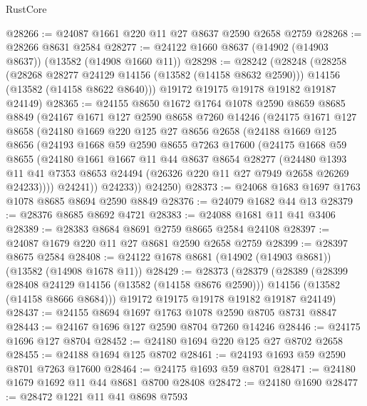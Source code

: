 \begin{lexlean}{RustCore}
\begin{coremodule}
@28266 := @24087 @1661 @220 @11 @27 @8637 @2590 @2658 @2759
@28268 := @28266 @8631 @2584
@28277 := @24122 @1660 @8637 (@14902 (@14903 @8637)) (@13582 (@14908 @1660 @11))
@28298 := @28242
    (@28248
      (@28258
        (@28268 @28277 @24129 @14156 (@13582 (@14158 @8632 @2590)))
        @14156
        (@13582 (@14158 @8622 @8640)))
      @19172
      @19175
      @19178
      @19182
      @19187
      @24149)
@28365 := @24155
    @8650
    @1672
    @1764
    @1078
    @2590
    @8659
    @8685
    @8849
    (@24167
      @1671
      @127
      @2590
      @8658
      @7260
      @14246
      (@24175
        @1671
        @127
        @8658
        (@24180
          @1669
          @220
          @125
          @27
          @8656
          @2658
          (@24188
            @1669
            @125
            @8656
            (@24193
              @1668
              @59
              @2590
              @8655
              @7263
              @17600
              (@24175
                @1668
                @59
                @8655
                (@24180
                  @1661
                  @1667
                  @11
                  @44
                  @8637
                  @8654
                  @28277
                  (@24480
                    @1393
                    @11
                    @41
                    @7353
                    @8653
                    @24494
                    (@26326 @220 @11 @27 @7949 @2658 @26269 @24233))))
              @24241))
          @24233))
      @24250)
@28373 := @24068 @1683 @1697 @1763 @1078 @8685 @8694 @2590 @8849
@28376 := @24079 @1682 @44 @13
@28379 := @28376 @8685 @8692 @4721
@28383 := @24088 @1681 @11 @41 @3406
@28389 := @28383 @8684 @8691 @2759 @8665 @2584 @24108
@28397 := @24087 @1679 @220 @11 @27 @8681 @2590 @2658 @2759
@28399 := @28397 @8675 @2584
@28408 := @24122 @1678 @8681 (@14902 (@14903 @8681)) (@13582 (@14908 @1678 @11))
@28429 := @28373
    (@28379
      (@28389
        (@28399 @28408 @24129 @14156 (@13582 (@14158 @8676 @2590)))
        @14156
        (@13582 (@14158 @8666 @8684)))
      @19172
      @19175
      @19178
      @19182
      @19187
      @24149)
@28437 := @24155 @8694 @1697 @1763 @1078 @2590 @8705 @8731 @8847
@28443 := @24167 @1696 @127 @2590 @8704 @7260 @14246
@28446 := @24175 @1696 @127 @8704
@28452 := @24180 @1694 @220 @125 @27 @8702 @2658
@28455 := @24188 @1694 @125 @8702
@28461 := @24193 @1693 @59 @2590 @8701 @7263 @17600
@28464 := @24175 @1693 @59 @8701
@28471 := @24180 @1679 @1692 @11 @44 @8681 @8700 @28408
@28472 := @24180 @1690
@28477 := @28472 @1221 @11 @41 @8698 @7593

\end{coremodule}
\end{lexlean}
